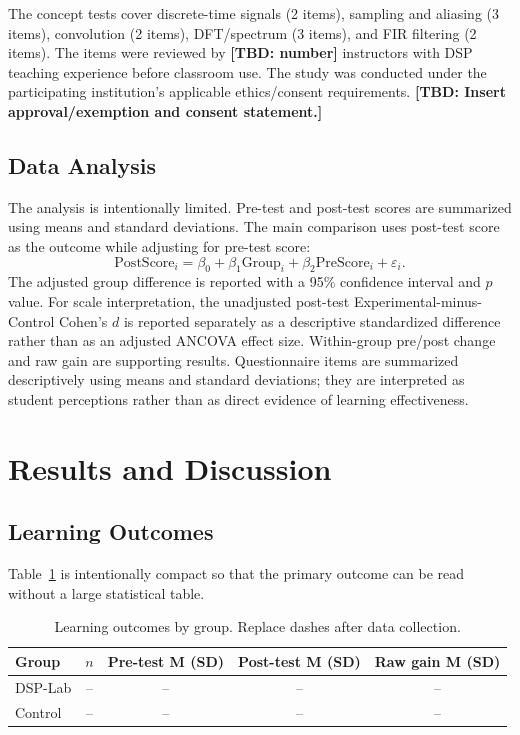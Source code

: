 \documentclass[11pt,a4paper]{article}
\newcommand{\tbd}[1]{\textbf{[TBD: #1]}}
\begin{document}
The concept tests cover discrete-time signals (2 items), sampling and aliasing (3 items), convolution (2 items), DFT/spectrum (3 items), and FIR filtering (2 items). The items were reviewed by \tbd{number} instructors with DSP teaching experience before classroom use. The study was conducted under the participating institution's applicable ethics/consent requirements. \tbd{Insert approval/exemption and consent statement.}



\subsection{Data Analysis}
The analysis is intentionally limited. Pre-test and post-test scores are summarized using means and standard deviations. The main comparison uses post-test score as the outcome while adjusting for pre-test score:
\begin{equation}
\mathrm{PostScore}_i = \beta_0 + \beta_1\mathrm{Group}_i + \beta_2\mathrm{PreScore}_i + \varepsilon_i.
\end{equation}
The adjusted group difference is reported with a 95\% confidence interval and $p$ value. For scale interpretation, the unadjusted post-test Experimental-minus-Control Cohen's $d$ is reported separately as a descriptive standardized difference rather than as an adjusted ANCOVA effect size. Within-group pre/post change and raw gain are supporting results. Questionnaire items are summarized descriptively using means and standard deviations; they are interpreted as student perceptions rather than as direct evidence of learning effectiveness.

\section{Results and Discussion}
\subsection{Learning Outcomes}
Table~\ref{tab:outcomes} is intentionally compact so that the primary outcome can be read without a large statistical table.

\begin{table}[htbp]
\centering
\caption{Learning outcomes by group. Replace dashes after data collection.}
\label{tab:outcomes}
\small
\begin{tabular}{lcccc}
\toprule
Group & $n$ & Pre-test M (SD) & Post-test M (SD) & Raw gain M (SD) \\
\midrule
DSP-Lab & -- & -- & -- & -- \\
Control & -- & -- & -- & -- \\
\bottomrule
\end{tabular}
\end{table}
\end{document}
